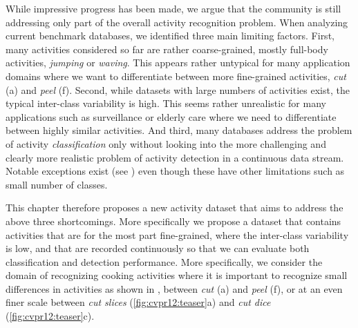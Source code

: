 While impressive progress has been made, we argue that 
the community is still addressing only part of the overall activity recognition problem. When analyzing
current benchmark databases, we identified three main limiting factors. 
First, many activities considered so far are rather coarse-grained, 
\ie mostly full-body activities, \eg \emph{jumping} or \emph{waving}.
This appears rather untypical for many application domains where we want 
to differentiate between more fine-grained activities, \eg \emph{cut} (a)  and \emph{peel} (f). 
Second, while datasets with large
numbers of activities exist, the typical inter-class variability is high. This seems rather unrealistic
for many applications such as surveillance or elderly care where we need to differentiate
between highly similar activities. 
And third, many
databases address the problem of activity {\em classification} only without looking into 
the more challenging and clearly more realistic problem of activity detection in a continuous 
data stream. 
Notable exceptions exist (see )
even though these have other limitations such as small number of classes. 



This chapter therefore proposes a new activity dataset that aims to address the above three
shortcomings. More specifically we propose a dataset that contains \DBnActivities activities that are 
for the most part fine-grained, where the inter-class variability is low,  
and that are recorded continuously so that we can evaluate both classification 
and detection performance. 
More specifically, we consider the domain of recognizing cooking activities where it is important to recognize small differences in activities as shown in , \eg between \emph{cut} (a) and \emph{peel} (f), or at an even finer scale between \emph{cut slices} (\ref{fig:cvpr12:teaser}a) and \emph{cut dice} (\ref{fig:cvpr12:teaser}c).

